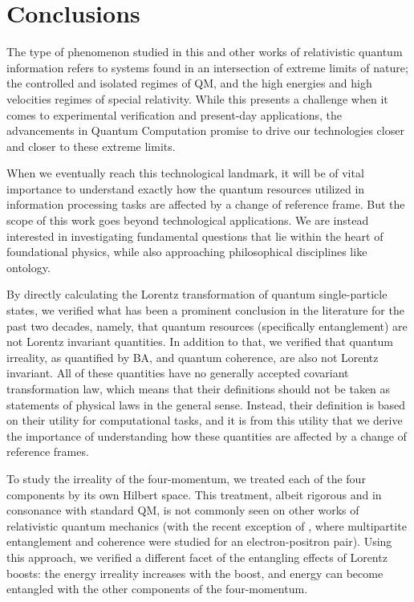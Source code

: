 \documentclass[12pt,a4paper,notitlepage]{report}
\begin{document}
\pagebreak


\chapter{Conclusions}


The type of phenomenon studied in this and other works of relativistic quantum information refers to systems found in an intersection of extreme limits of nature; the controlled and isolated regimes of QM, and the high energies and high velocities regimes of special relativity. While this presents a challenge when it comes to experimental verification and present-day applications, the advancements in Quantum Computation promise to drive our technologies closer and closer to these extreme limits.

When we eventually reach this technological landmark, it will be of vital importance to understand exactly how the quantum resources utilized in information processing tasks are affected by a change of reference frame. But the scope of this work goes beyond technological applications. We are instead interested in investigating fundamental questions that lie within the heart of foundational physics, while also approaching philosophical disciplines like ontology.


By directly calculating the Lorentz transformation of quantum single-particle states, we verified what has been a prominent conclusion in the literature for the past two decades, namely, that quantum resources (specifically entanglement) are not Lorentz invariant quantities. In addition to that, we verified that quantum irreality, as quantified by BA, and quantum coherence, are also not Lorentz invariant. All of these quantities have no generally accepted covariant transformation law, which means that their definitions should not be taken as statements of physical laws in the general sense. Instead, their definition is based on their utility for computational tasks, and it is from this utility that we derive the importance of understanding how these quantities are affected by a change of reference frames.

To study the irreality of the four-momentum, we treated each of the four components by its own Hilbert space. This treatment, albeit rigorous and in consonance with standard QM, is not commonly seen on other works of relativistic quantum mechanics (with the recent exception of \cite{petreca_2021}, where multipartite entanglement and coherence were studied for an electron-positron pair). Using this approach, we verified a different facet of the entangling effects of Lorentz boosts: the energy irreality increases with the boost, and energy can become entangled with the other components of the four-momentum.
\end{document}
